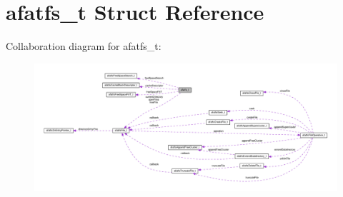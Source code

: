 \hypertarget{structafatfs__t}{\section{afatfs\+\_\+t Struct Reference}
\label{structafatfs__t}
}


Collaboration diagram for afatfs\+\_\+t\+:\nopagebreak
\begin{figure}[H]
\begin{center}
\leavevmode
\includegraphics[width=350pt]{structafatfs__t__coll__graph}
\end{center}
\end{figure}
